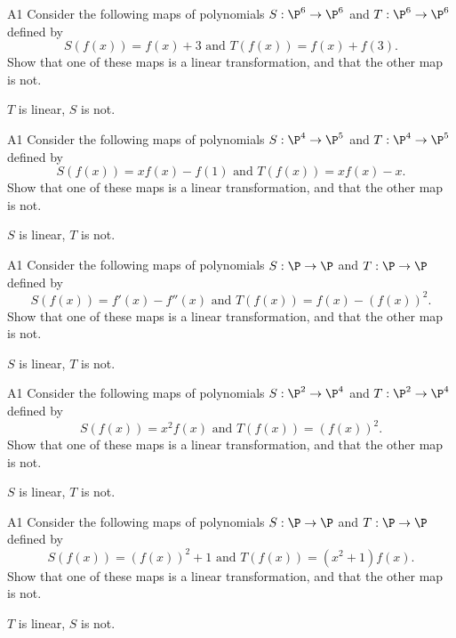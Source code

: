 \begin{problem}{A1}
Consider the following maps of polynomials \(S: \P^6 \rightarrow \P^6\)
and \(T:\P^6\rightarrow\P^6\) defined by
\[S(f(x))= f(x)+3 \text{ and }T(f(x)) = f(x)+f(3).\]
Show that one of these maps is a linear transformation, and that the other
map is not.
\end{problem}
\begin{solution}
  \(T\) is linear, \(S\) is not.
\end{solution}

\begin{problem}{A1}
Consider the following maps of polynomials \(S: \P^4 \rightarrow \P^5\)
and \(T:\P^4\rightarrow\P^5\) defined by
\[S(f(x))= xf(x)-f(1) \text{ and }T(f(x)) = xf(x)-x.\]
Show that one of these maps is a linear transformation, and that the other
map is not.
\end{problem}
\begin{solution}
  \(S\) is linear, \(T\) is not.
\end{solution}

\begin{problem}{A1}
Consider the following maps of polynomials \(S: \P \rightarrow \P\)
and \(T:\P\rightarrow\P\) defined by
\[S(f(x))= f'(x)-f''(x) \text{ and }T(f(x)) = f(x)-(f(x))^2.\]
Show that one of these maps is a linear transformation, and that the other
map is not.
\end{problem}
\begin{solution}
  \(S\) is linear, \(T\) is not.
\end{solution}


\begin{problem}{A1}
Consider the following maps of polynomials \(S: \P^2 \rightarrow \P^4\)
and \(T:\P^2\rightarrow\P^4\) defined by
\[S(f(x))= x^2f(x) \text{ and }T(f(x)) = (f(x))^2.\]
Show that one of these maps is a linear transformation, and that the other
map is not.
\end{problem}
\begin{solution}
  \(S\) is linear, \(T\) is not.
\end{solution}

\begin{problem}{A1}
Consider the following maps of polynomials \(S: \P \rightarrow \P\)
and \(T:\P\rightarrow\P\) defined by
\[S(f(x))= (f(x))^2+1 \text{ and }T(f(x)) = (x^2+1)f(x).\]
Show that one of these maps is a linear transformation, and that the other
map is not.
\end{problem}
\begin{solution}
  \(T\) is linear, \(S\) is not.
\end{solution}

